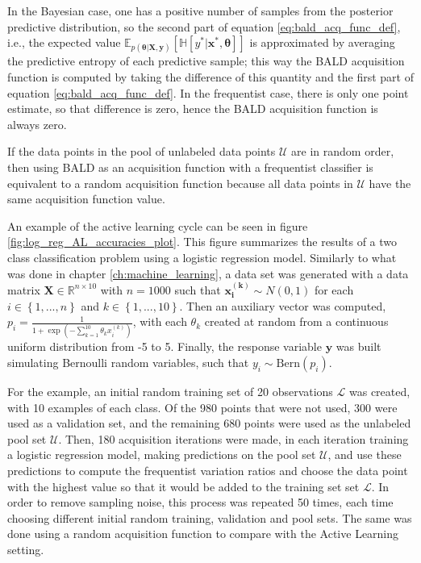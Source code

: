 In the Bayesian case, one has a positive number of samples from the posterior predictive distribution, so the second part of equation \eqref{eq:bald_acq_func_def}, i.e., the expected value
$\mathbb{E}_{p(\boldsymbol{\theta} | \boldsymbol{X}, \boldsymbol{y})} \left[ \mathbb{H} \left[ y^* | \boldsymbol{x}^*, \boldsymbol{\theta} \right] \right]$
is approximated by averaging the predictive entropy of each predictive sample; this way the BALD acquisition function is computed by taking the difference of this quantity and the first part of equation \eqref{eq:bald_acq_func_def}.
In the frequentist case, there is only one point estimate, so that difference is zero, hence the BALD acquisition function is always zero.

If the data points in the pool of unlabeled data points $\mathcal{U}$ are in random order, then using BALD as an acquisition function with a frequentist classifier is equivalent to a random acquisition function because all data points in $\mathcal{U}$ have the same acquisition function value.

An example of the active learning cycle can be seen in figure \ref{fig:log_reg_AL_accuracies_plot}. This figure summarizes the results of a two class classification problem using a logistic regression model. Similarly to what was done in chapter \ref{ch:machine_learning}, a data set was generated with a data matrix $\boldsymbol{X} \in \mathbb{R}^{n \times 10}$ with $n = 1000$ such that $\boldsymbol{x_i^{(k)}} \sim N(0, 1)$ for each $i \in \left\{1, ..., n \right\}$ and $k \in \left\{1, ..., 10 \right\}$.
Then an auxiliary vector was computed, $p_i = \frac{1}{1 + \exp \left( - \sum_{k = 1}^{10} \theta_k x_i^{(k)}  \right)}$, with each $\theta_k$ created at random from a continuous uniform distribution from -5 to 5. Finally, the response variable $\boldsymbol{y}$ was built simulating Bernoulli random variables, such that $y_i \sim \mathrm{Bern}(p_i)$.

For the example, an initial random training set of 20 observations $\mathcal{L}$ was created, with 10 examples of each class. Of the 980 points that were not used, 300 were used as a validation set, and the remaining 680 points were used as the unlabeled pool set $\mathcal{U}$.
Then, 180 acquisition iterations were made, in each iteration training a logistic regression model, making predictions on the pool set $\mathcal{U}$, and use these predictions to compute the frequentist variation ratios and choose the data point with the highest value so that it would be added to the training set set $\mathcal{L}$. In order to remove sampling noise, this process was repeated 50 times, each time choosing different initial random training, validation and pool sets. The same was done using a random acquisition function to compare with the Active Learning setting.

